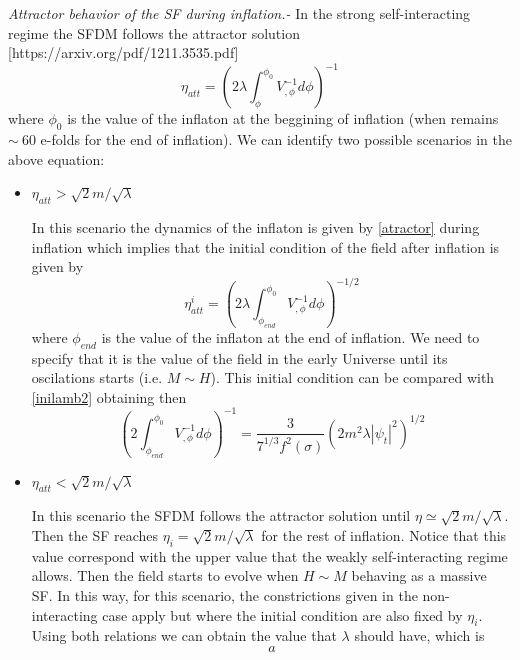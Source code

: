 \documentclass[twocolumn,           %
               showpacs,            %
               preprintnumbers,     %
               aps,                 %
               prl,          	    %
               letterpaper,             %
               superscriptaddress,      %
               nofootinbib,         %
               tightenlines,        %
               floats,floatfix      %
               ,usenatbib,
               ]{revtex4-1}
\begin{document}
\textit{Attractor behavior of the SF during inflation.-} In the strong self-interacting regime the SFDM follows the attractor solution [https://arxiv.org/pdf/1211.3535.pdf]
\begin{equation}\label{atractor}
\eta_{att} =\left(2\lambda\int_{\phi}^{\phi_0}V^{-1}_{,\phi}d\phi\right)^{-1}
\end{equation}
where $\phi_0$ is the value of the inflaton at the beggining of inflation (when remains $\sim \ 60$ e-folds for the end of inflation). We can identify two possible scenarios in the above equation:
\begin{itemize}
\item $\eta_{att}>\sqrt{2}m/\sqrt{\lambda}$

In this scenario the dynamics of the inflaton is given by \eqref{atractor} during inflation which implies that the initial condition of the field after inflation is given by
\begin{equation}\label{atractor2}
\eta_{att}^i = \left(2\lambda\int_{\phi_{end}}^{\phi_0}V^{-1}_{,\phi}d\phi\right)^{-1/2}
\end{equation}
where $\phi_{end}$ is the value of the inflaton at the end of inflation. We need to specify that it is the value of the field in the early Universe until its oscilations starts (i.e. $M\sim H$). This initial condition can be compared with \eqref{inilamb2} obtaining then
\begin{equation}\label{inilamb2}
\left(2\int_{\phi_{end}}^{\phi_0}V^{-1}_{,\phi}d\phi\right)^{-1}=\frac{3}{7^{1/3}f^2(\sigma)}\left(2m^2\lambda|\psi_t|^2\right)^{1/2}
\end{equation}


\item $\eta_{att}<\sqrt{2}m/\sqrt{\lambda}$

In this scenario the SFDM follows the attractor solution until $\eta\simeq \sqrt{2}m/\sqrt{\lambda}$. Then the SF reaches $\eta_i=\sqrt{2}m/\sqrt{\lambda}$ for the rest of inflation. Notice that this value correspond with the upper value that the weakly self-interacting regime allows. Then the field starts to evolve when $H\sim M$ behaving as a massive SF. In this way, for this scenario, the constrictions given in the non-interacting case apply but where the initial condition are also fixed by $\eta_i$. Using both relations we can obtain the value that $\lambda$ should have, which is
\begin{equation}
a\end{equation}
\end{itemize}
\end{document}
